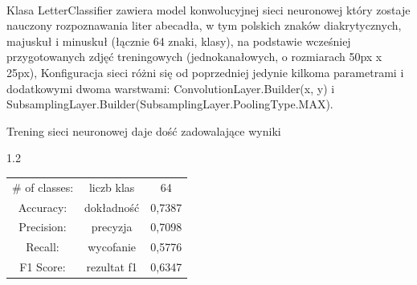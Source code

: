 \documentclass[a4paper,12pt]{article}
\newcommand\spacingInSolemnItemize{1.2}
\begin{document}
            \paragraph{\indent} Klasa LetterClassifier zawiera model konwolucyjnej sieci neuronowej który           zostaje nauczony rozpoznawania liter abecadła, w tym polskich znaków     diakrytycznych, majuskuł i minuskuł (łącznie 64 znaki, klasy), na           podstawie wcześniej przygotowanych zdjęć treningowych (jednokanałowych,     o rozmiarach 50px x 25px), Konfiguracja sieci różni się od poprzedniej     jedynie kilkoma parametrami i dodatkowymi dwoma warstwami:                  ConvolutionLayer.Builder(x, y) i 
                SubsamplingLayer.Builder(SubsamplingLayer.PoolingType.MAX).
	       
	       
	       
	       
	       
            

            Trening sieci neuronowej daje dość zadowalające wyniki 
    
            \begin{spacing}{\spacingInSolemnItemize}
                \begin{center}
                \begin{tabular}{ c c c  }
                    \# of classes: &  liczb klas & 64 \\
                    Accuracy:  & dokładność & 0,7387  \\ 
                    Precision:  & precyzja & 0,7098 \\  
                    Recall: & wycofanie & 0,5776      \\
                    F1 Score: & rezultat f1 & 0,6347
                \end{tabular}
                \end{center}
            \end{spacing}
            
\end{document}
